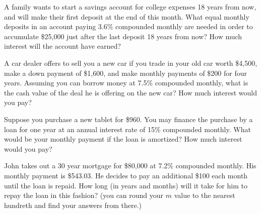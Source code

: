 \documentclass[11pt,epsfig]{article}
\begin{document}
\begin{problem}{12}
A family wants to start a savings account for college expenses 18 years from now, and will make their first deposit at the end of this month. What equal monthly deposits in an account paying 3.6\% compounded monthly are needed in order to accumulate \$25,000 just after the last deposit 18 years from now? How much interest will the account have earned?  

\vfill
\end{problem}

\begin{problem}{12}
A car dealer offers to sell you a new car if you trade in your old car worth \$4,500, make a down payment of \$1,600, and make monthly payments of \$200 for four years. Assuming you can borrow money at 7.5\% compounded monthly, what is the cash value of the deal he is offering on the new car? How much interest would you pay?
  
\vfill
\end{problem}


\newpage


\begin{problem}{12}
Suppose you purchase a new tablet for \$960. You may finance the purchase by a loan for one year at an annual interest rate of 15\% compounded monthly. What would be your monthly payment if the loan is amortized? How much interest would you pay?

\vfill
\end{problem}

\begin{problem}{12}
John takes out a 30 year mortgage for \$80,000 at 7.2\% compounded monthly. His monthly payment is \$543.03. He decides to pay an additional \$100 each month until the loan is repaid. How long (in years and months) will it take for him to repay the loan in this fashion? (you can round your $m$ value to the nearest hundreth and find your answers from there.)


\vfill
\end{problem}
\end{document}
